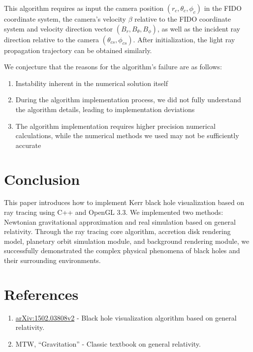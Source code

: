 \documentclass[11pt,a4paper]{article}
\begin{document}
This algorithm requires as input the camera position $(r_c,\theta_c,\phi_c)$ in the FIDO coordinate system, the camera's velocity $\beta$ relative to the FIDO coordinate system and velocity direction vector $(B_r,B_\theta,B_\phi)$, as well as the incident ray direction relative to the camera $(\theta_{cs},\phi_{cs})$. After initialization, the light ray propagation trajectory can be obtained similarly.

We conjecture that the reasons for the algorithm's failure are as follows:

\begin{enumerate}
    \item Instability inherent in the numerical solution itself
    \item During the algorithm implementation process, we did not fully understand the algorithm details, leading to implementation deviations
    \item The algorithm implementation requires higher precision numerical calculations, while the numerical methods we used may not be sufficiently accurate
\end{enumerate}

\section{Conclusion}

This paper introduces how to implement Kerr black hole visualization based on ray tracing using C++ and OpenGL 3.3. We implemented two methods: Newtonian gravitational approximation and real simulation based on general relativity. Through the ray tracing core algorithm, accretion disk rendering model, planetary orbit simulation module, and background rendering module, we successfully demonstrated the complex physical phenomena of black holes and their surrounding environments.

\section{References}

\begin{enumerate}
    \item \href{https://arxiv.org/abs/1502.03808v2}{arXiv:1502.03808v2} - Black hole visualization algorithm based on general relativity.
    \item MTW, ``Gravitation'' - Classic textbook on general relativity.
\end{enumerate}
\end{document}

